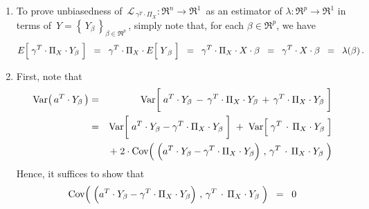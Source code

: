 \proof
\begin{enumerate}
\item
	To prove unbiasedness of
	\,$\mathcal{L}_{\,\gamma^{T} \cdot \Pi_{X}} : \Re^{n} \longrightarrow \Re^{1}$\,
	as an estimator of $\lambda : \Re^{p} \longrightarrow \Re^{1}$
	in terms of \,$Y = \left\{\,Y_{\beta}\,\right\}_{\beta\in\Re^{p}}$\,,
	simply note that, for each $\beta \in \Re^{p}$, we have
	\begin{equation*}
	E\!\left[\;\gamma^{T} \cdot \overset{{\color{white}.}}{\Pi}_{X} \cdot Y_{\beta}\;\right]
	\;\; = \;\;
		\gamma^{T} \cdot \Pi_{X} \cdot E\!\left[\;\overset{{\color{white}.}}{Y}_{\beta}\;\right]
	\;\; = \;\;
		\gamma^{T} \cdot \Pi_{X} \cdot X \cdot \beta
	\;\; = \;\;
		\gamma^{T} \cdot X \cdot \beta
	\;\; = \;\;
		\lambda(\beta)\,.
	\end{equation*}
\item
	First, note that
	\begin{eqnarray*}
	\Var\!\left(\,a^{T} \cdot Y_{\beta}\,\right)
	&=&
		\Var\!\left[\;
			a^{T} \cdot Y_{\beta}
			\,\overset{{\color{white}+}}{-}\,
			\gamma^{T} \cdot \Pi_{X} \cdot Y_{\beta}
			\,+\,
			\gamma^{T} \cdot \Pi_{X} \cdot Y_{\beta}
			\;\right]
	\\
	&=&
		\Var\!\left[\;
			a^{T} \cdot Y_{\beta}
			\overset{{\color{white}+}}{-}
			\gamma^{T} \cdot \Pi_{X} \cdot Y_{\beta}
				\;\right]
		\; + \;
		\Var\!\left[\;
			\gamma^{T} \overset{{\color{white}+}}{\cdot} \Pi_{X} \cdot Y_{\beta}
			\;\right]
	\\
	&&	+ \;
		2\cdot\Cov\!\left(\;
			\left(a^{T} \cdot Y_{\beta}
			\overset{{\color{white}.}}{-}
			\gamma^{T} \cdot \Pi_{X} \cdot Y_{\beta}\right)
			\,,\,
			\gamma^{T} \overset{{\color{white}+}}{\cdot} \Pi_{X} \cdot Y_{\beta}
			\;\right)
	\end{eqnarray*}
	Hence, it suffices to show that
	\begin{equation*}
		\Cov\!\left(\;
			\left(a^{T} \cdot Y_{\beta}
			\overset{{\color{white}.}}{-}
			\gamma^{T} \cdot \Pi_{X} \cdot Y_{\beta}\right)
			\,,\,
			\gamma^{T} \overset{{\color{white}+}}{\cdot} \Pi_{X} \cdot Y_{\beta}
			\;\right)
		\;\; = \;\; 0
	\end{equation*}
	

\end{enumerate}
